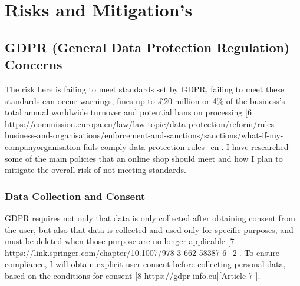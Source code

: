 \documentclass[]{project_report}
\begin{document}
\begin{center}
\end{center}



\chapter{Risks and Mitigation's}

\section{GDPR (General Data Protection Regulation) Concerns}

The risk here is failing to meet standards set by GDPR, failing to meet these standards can occur warnings, fines up to £20 million or 4\% of the business’s total annual worldwide turnover and potential bans on processing [6 https://commission.europa.eu/law/law-topic/data-protection/reform/rules-business-and-organisations/enforcement-and-sanctions/sanctions/what-if-my-companyorganisation-fails-comply-data-protection-rules_en]. I have researched some of the main policies that an online shop should meet and how I plan to mitigate the overall risk of not meeting standards.

\subsection{Data Collection and Consent}
GDPR requires not only that data is only collected after obtaining consent from the user, but also that data is collected and used only for specific purposes, and must be deleted when those purpose are no longer applicable [7 https://link.springer.com/chapter/10.1007/978-3-662-58387-6_2]. To ensure compliance, I will obtain explicit user consent before collecting personal data, based on the conditions for consent [8 https://gdpr-info.eu][Article 7 ].
\end{document}
